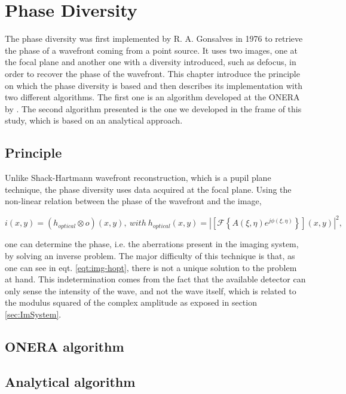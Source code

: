 \chapter{Phase Diversity}
\label{ch:PDThe}

The phase diversity was first implemented by R. A. Gonsalves in 1976 \citep{Gonsalves_1976,Gonsalves_1982} to retrieve the phase of a wavefront coming from a point source. It uses two images, one at the focal plane and another one with a diversity introduced, such as defocus, in order to recover the phase of the wavefront. This chapter introduce the principle on which the phase diversity is based and then describes its implementation with two different algorithms. The first one is an algorithm developed at the ONERA by \citet{mugnier_2006}. The second algorithm presented is the one we developed in the frame of this study, which is based on an analytical approach.

\section{Principle}

Unlike Shack-Hartmann wavefront reconstruction, which is a pupil plane technique, the phase diversity uses data acquired at the focal plane. Using the non-linear relation between the phase of the wavefront and the image, 

\begin{equation}
i(x,y) = (h_{optical}\otimes o)(x,y), \ with \ h_{optical}(x,y) = |\left[\mathcal{F}\left\lbrace A(\xi,\eta)e^{j\phi(\xi,\eta)} \right\rbrace\right](x,y)|^2,
\label{eqt:img-hopt}
\end{equation}

one can determine the phase, i.e. the aberrations present in the imaging system, by solving an inverse problem. The major difficulty of this technique is that, as one can see in eqt. \eqref{eqt:img-hopt}, there is not a unique solution to the problem at hand. This indetermination comes from the fact that the available detector can only sense the intensity of the wave, and not the wave itself, which is related to the modulus squared of the complex amplitude as exposed in section \ref{sec:ImSystem}.

\section{ONERA algorithm}

\section{Analytical algorithm}